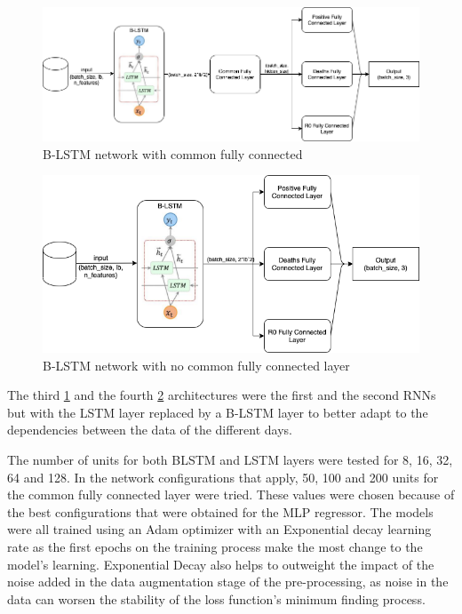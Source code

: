 \documentclass[anon]{CI}
\begin{document}
\begin{figure}[!ht]
    \center
    \includegraphics[width=\linewidth]{Networks-BLSTM-Hidden}
    \caption{\label{fig:BLSTM-hidden}B-LSTM network with common fully connected}
\end{figure}

\begin{figure}[!ht]
    \center
    \includegraphics[width=\linewidth]{Networks-BLSTM-NoHidden}
    \caption{\label{fig:BLSTM-nohidden}B-LSTM network with no common fully connected layer}
\end{figure}

The third \ref{fig:BLSTM-hidden} and the fourth \ref{fig:BLSTM-nohidden} architectures were the first and the second RNNs but with the LSTM layer replaced by a B-LSTM layer to better adapt to the dependencies between the data of the different days.

The number of units for both BLSTM and LSTM layers were tested for 8, 16, 32, 64 and 128. In the network configurations that apply, 50, 100 and 200 units for the common fully connected layer were tried. These values were chosen because of the best configurations that were obtained for the MLP regressor. The models were all trained using an Adam optimizer with an Exponential decay learning rate as the first epochs on the training process make the most change to the model's learning. Exponential Decay also helps to outweight the impact of the noise added in the data augmentation stage of the pre-processing, as noise in the data can worsen the stability of the loss function's minimum finding process. 
\end{document}

